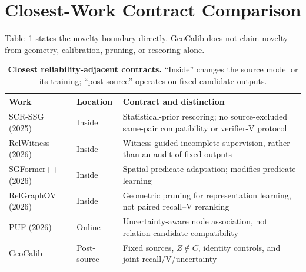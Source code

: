 \section{Closest-Work Contract Comparison}

Table~\ref{tab:closest-contracts} states the novelty boundary directly.
GeoCalib does not claim novelty from geometry, calibration, pruning, or
rescoring alone.

\begin{table}[H]
\centering
\scriptsize
\setlength{\tabcolsep}{3pt}
\caption{\textbf{Closest reliability-adjacent contracts.} ``Inside'' changes
the source model or its training; ``post-source'' operates on fixed candidate
outputs.}
\label{tab:closest-contracts}
\begin{tabularx}{\columnwidth}{l l X}
\toprule
Work & Location & Contract and distinction \\
\midrule
SCR-SSG (2025) & Inside & Statistical-prior rescoring; no source-excluded same-pair compatibility or verifier-V protocol \\
RelWitness (2026) & Inside & Witness-guided incomplete supervision, rather than an audit of fixed outputs \\
SGFormer++ (2026) & Inside & Spatial predicate adaptation; modifies predicate learning \\
RelGraphOV (2026) & Inside & Geometric pruning for representation learning, not paired recall--V reranking \\
PUF (2026) & Online & Uncertainty-aware node association, not relation-candidate compatibility \\
GeoCalib & Post-source & Fixed sources, $Z\notin C$, identity controls, and joint recall/V/uncertainty \\
\bottomrule
\end{tabularx}
\end{table}
